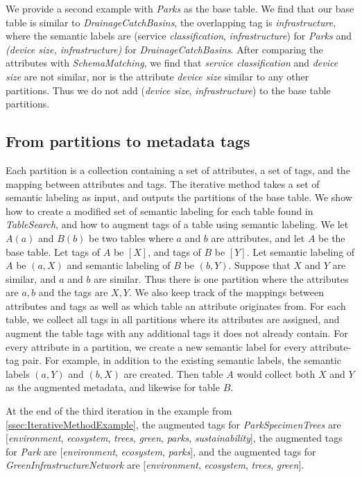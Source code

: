 We provide a second example with \textit{Parks} as the base table. We find that our base table is similar to \textit{DrainageCatchBasins}, the overlapping tag is \textit{infrastructure}, where the semantic labels are (service \textit{classification}, \textit{infrastructure}) for \textit{Parks} and \textit{(device size, infrastructure)} for \textit{DrainageCatchBasins}. After comparing the attributes with \textit{SchemaMatching}, we find that \textit{service classification} and \textit{device size} are not similar, nor is the attribute \textit{device size} similar to any other partitions. Thus we do not add (\textit{device size}, \textit{infrastructure}) to the base table partitions.

\subsection{From partitions to metadata tags}
\label{ssec:FromPartitionsToMetadataTags}

Each partition is a collection containing a set of attributes, a set of tags, and the mapping between attributes and tags. The iterative method takes a set of semantic labeling as input, and outputs the partitions of the base table. We show how to create a modified set of semantic labeling for each table found in \textit{TableSearch}, and how to augment tags of a table using semantic labeling. We let $A(a)$ and $B(b)$ be two tables where $a$ and $b$ are attributes, and let $A$ be the base table. Let tags of $A$ be $[X]$, and tags of $B$ be $[Y]$. Let semantic labeling of $A$ be ${(a, X)}$ and semantic labeling of $B$ be ${(b, Y)}$. Suppose that $X$ and $Y$ are similar, and $a$ and $b$ are similar. Thus there is one partition where the attributes are ${a, b}$ and the tags are ${X, Y}$. We also keep track of the mappings between attributes and tags as well as which table an attribute originates from. For each table, we collect all tags in all partitions where its attributes are assigned, and augment the table tags with any additional tags it does not already contain. For every attribute in a partition, we create a new semantic label for every attribute-tag pair. For example, in addition to the existing semantic labels, the semantic labels $(a, Y)$ and $(b, X)$ are created. Then table $A$ would collect both $X$ and $Y$ as the augmented metadata, and likewise for table $B$.

At the end of the third iteration in the example from \autoref{ssec:IterativeMethodExample}, the augmented tags for \textit{ParkSpecimenTrees} are [\textit{environment}, \textit{ecosystem}, \textit{trees}, \textit{green}, \textit{parks}, \textit{sustainability}], the augmented tags for \textit{Park} are [\textit{environment}, \textit{ecosystem}, \textit{parks}], and the augmented tags for \textit{GreenInfrastructureNetwork} are [\textit{environment}, \textit{ecosystem}, \textit{trees}, \textit{green}].

